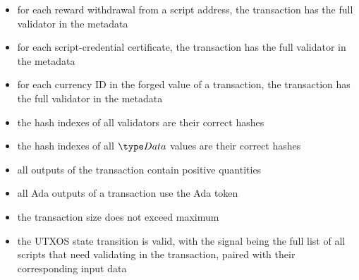 \begin{itemize}
  \item for each reward withdrawal from a script address, the transaction
  has the full validator in the metadata

  \item for each script-credential certificate, the transaction
  has the full validator in the metadata

  \item for each currency ID in the forged value of a transaction, the transaction
  has the full validator in the metadata 

  \item the hash indexes of all validators are their correct hashes

  \item the hash indexes of all $\Data$ values are their correct hashes

  \item all outputs of the transaction contain positive quantities

  \item all Ada outputs of a transaction use the Ada token

  \item the transaction size does not exceed maximum

  \item the UTXOS state transition is valid, with the signal being
  the full list of all scripts that need validating in the transaction, paired with
  their corresponding input data
\end{itemize}


